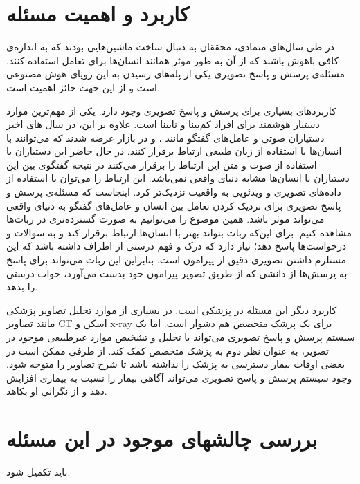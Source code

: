 \section{کاربرد و اهمیت مسئله}
{
در طی سال‌های متمادی، محققان به دنبال ساخت ماشین‌هایی بودند که به اندازه‌ی کافی باهوش باشند که از آن به طور موثر همانند انسان‌ها برای تعامل استفاده کنند. مسئله‌ی پرسش و پاسخ تصویری یکی از پله‌های رسیدن به این رویای هوش مصنوعی است و از این جهت حائز اهمیت است.

کاربردهای بسیاری برای پرسش و پاسخ تصویری وجود دارد. یکی از مهم‌ترین موارد دستیار هوشمند برای افراد کم‌بینا و نابینا  است. علاوه بر این، در سال های اخیر دستیاران صوتی  و عامل‌های گفتگو  مانند  
،
و
  در بازار عرضه شدند که می‌توانند با انسان‌ها با استفاده از زبان طبیعی ارتباط برقرار کنند. در حال حاضر این دستیاران با استفاده از صوت و متن این ارتباط را برقرار می‌کنند در نتیجه گفتگوی بین این دستیاران با انسان‌ها مشابه دنیای واقعی نمی‌باشد. این ارتباط را می‌توان با استفاده از داده‌های تصویری و ویدئویی به واقعیت نزدیک‌تر کرد. اینجاست که مسئله‌ی پرسش و پاسخ تصویری برای نزدیک کردن تعامل بین انسان و عامل‌های گفتگو به دنیای واقعی می‌تواند موثر باشد.  همین موضوع را می‌توانیم به صورت گسترده‌تری در ربات‌ها مشاهده کنیم. برای این‌که ربات بتواند بهتر با انسان‌ها ارتباط برقرار کند و به سوالات و درخواست‌ها پاسخ دهد؛ نیاز دارد که درک و فهم درستی از اطراف داشته باشد که این مستلزم داشتن تصویری دقیق از پیرامون است. بنابراین این ربات می‌تواند برای پاسخ به پرسش‌ها از دانشی که از طریق تصویر پیرامون خود بدست می‌آورد، جواب درستی را بدهد.
  
  کاربرد دیگر این مسئله در پزشکی است. در بسیاری از موارد تحلیل تصاویر پزشکی مانند تصاویر CT‌ اسکن و x-ray برای یک پزشک متخصص هم دشوار است. اما یک سیستم پرسش و پاسخ تصویری می‌تواند با تحلیل و تشخیص موارد غیرطبیعی موجود در تصویر، به عنوان نظر دوم به پزشک متخصص کمک کند. از طرفی ممکن است در بعضی اوقات بیمار دسترسی به پزشک را نداشته باشد تا شرح تصاویر را متوجه شود. وجود سیستم پرسش و پاسخ تصویری می‌تواند آگاهی بیمار را نسبت به بیماری افزایش دهد و از نگرانی او بکاهد.
}
\section{بررسی چالشهای موجود در این مسئله}
باید تکمیل شود.
